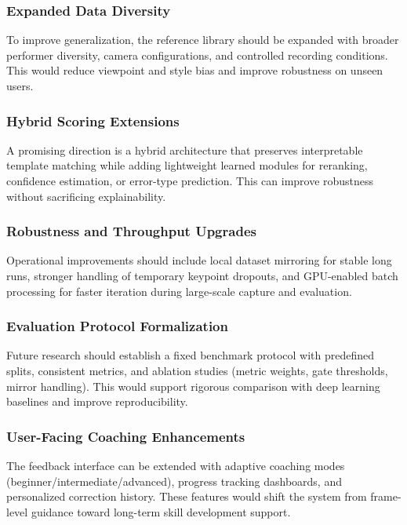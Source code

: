 \documentclass[12pt]{article}
\begin{document}
{\subsubsection{Expanded Data Diversity}

To improve generalization, the reference library should be expanded with broader performer diversity, camera configurations, and controlled recording conditions. This would reduce viewpoint and style bias and improve robustness on unseen users.

\subsubsection{Hybrid Scoring Extensions}

A promising direction is a hybrid architecture that preserves interpretable template matching while adding lightweight learned modules for reranking, confidence estimation, or error-type prediction. This can improve robustness without sacrificing explainability.

\subsubsection{Robustness and Throughput Upgrades}

Operational improvements should include local dataset mirroring for stable long runs, stronger handling of temporary keypoint dropouts, and GPU-enabled batch processing for faster iteration during large-scale capture and evaluation.

\subsubsection{Evaluation Protocol Formalization}

Future research should establish a fixed benchmark protocol with predefined splits, consistent metrics, and ablation studies (metric weights, gate thresholds, mirror handling). This would support rigorous comparison with deep learning baselines and improve reproducibility.

\subsubsection{User-Facing Coaching Enhancements}

The feedback interface can be extended with adaptive coaching modes (beginner/intermediate/advanced), progress tracking dashboards, and personalized correction history. These features would shift the system from frame-level guidance toward long-term skill development support.

}
\end{document}
